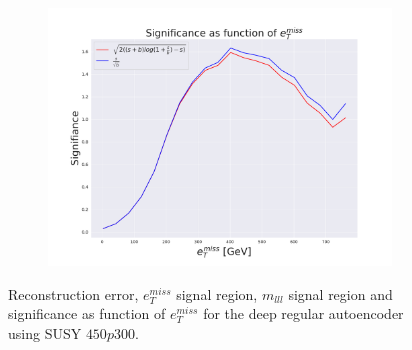 \begin{figure}[H]
\begin{subfigure}{.60\textwidth}
        \caption{}
        \label{fig:VAE_2lep_big_etmiss_450}
    \end{subfigure}
    \hfill 
    \begin{subfigure}{.60\textwidth}
        \includegraphics[width=\textwidth]{Figures/VAE_testing/big/2lep/significance_etmiss_450p0p0300_-0.8121874101107931.pdf}
        \caption{}
        \label{fig:VAE_2lep_big_signi_450}
    \end{subfigure}
    \hfill      
    \caption[2lep deep network | $450p300$ | VAE]{Reconstruction error, $e_T^{miss}$ signal region, $m_{lll}$ signal region and significance as function of 
    $e_T^{miss}$ for the deep regular autoencoder using SUSY $450p300$.}
    \label{fig:VAE_2lep_big_rec_sig_signi_450}
\end{figure}

